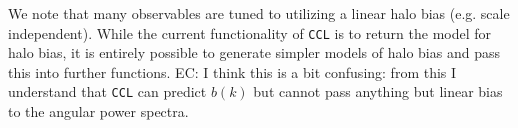 \documentclass[\docopts]{\docclass}
\newcommand{\todo}[1]{\textcolor{magenta}{To do: #1}}
\newcommand{\vol}[1]{\textcolor{red}{Volunteer: #1}}
\newcommand{\elisa}[1]{\textcolor{green!10!orange!90!}{EC: #1}}
\newcommand{\ccl}{{\tt CCL}\xspace}
\begin{document}
We note that many observables are tuned to utilizing a linear halo bias (e.g. scale independent). While the current functionality of \ccl is to return the \citet{Tinker2010} model for halo bias, it is entirely possible to generate simpler models of halo bias and pass this into further functions. \elisa{I think this is a bit confusing: from this I understand that \ccl can predict $b(k)$ but cannot pass anything but linear bias to the angular power spectra.}

\end{document}
